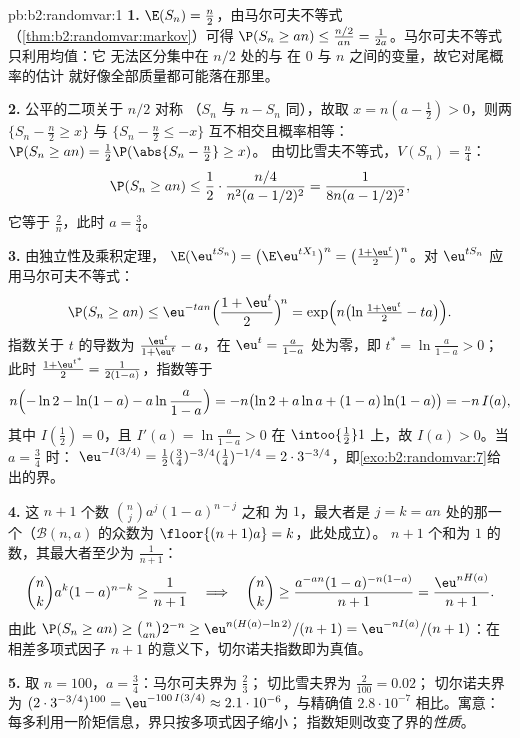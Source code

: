 \begin{solution}{pb:b2:randomvar:1}
\textbf{1.} $\E(S_n) = \frac n2$，由马尔可夫不等式
（\cref{thm:b2:randomvar:markov}）可得 $\P(S_n \geq an) \leq
\frac{n/2}{an} = \frac1{2a}$。马尔可夫不等式只利用均值：它
无法区分集中在 $n/2$ 处的与
在 $0$ 与 $n$ 之间的变量，故它对尾概率的估计
就好像全部质量都可能落在那里。

\textbf{2.} 公平的二项关于 $n/2$ 对称
（$S_n$ 与 $n - S_n$ 同），故取 $x = n(a -
\frac12) > 0$，则两 $\{S_n - \frac n2 \geq x\}$ 与
$\{S_n - \frac n2 \leq -x\}$ 互不相交且概率相等：
$\P(S_n \geq an) = \frac12\P(\abs{S_n - \frac n2} \geq x)$。
由切比雪夫不等式，$V(S_n) = \frac n4$：
\[
\P(S_n \geq an)
\leq \frac12\cdot\frac{n/4}{n^2(a - 1/2)^2}
= \frac1{8n(a - 1/2)^2},
\]
它等于 $\frac2n$，此时 $a = \frac34$。

\textbf{3.} 由独立性及乘积定理，
$\E(\eu^{tS_n}) = \bigl(\E \eu^{tX_1}\bigr)^n = \bigl(\frac{1
+ \eu^t}2\bigr)^n$。对 $\eu^{tS_n}$ 应用马尔可夫不等式：
\[
\P(S_n \geq an) \leq \eu^{-tan}\Bigl(\frac{1 +
\eu^t}2\Bigr)^{\!n} = \exp\Bigl(n\bigl(\ln\tfrac{1 +
\eu^t}2 - ta\bigr)\Bigr).
\]
指数关于 $t$ 的导数为 $\frac{\eu^t}{1 + \eu^t}
- a$，在 $\eu^t = \frac a{1-a}$ 处为零，即 $t^* =
\ln\frac a{1-a} > 0$；此时 $\frac{1 + \eu^{t^*}}2 =
\frac1{2(1-a)}$，指数等于
\[
n\Bigl(-\ln 2 - \ln(1-a) - a\ln\frac a{1-a}\Bigr)
= -n\bigl(\ln2 + a\ln a + (1-a)\ln(1-a)\bigr) = -n\,I(a),
\]
其中 $I(\frac12) = 0$，且 $I'(a) = \ln\frac a{1-a} > 0$
在 $\intoo{\frac12}1$ 上，故 $I(a) > 0$。当 $a = \frac34$ 时：
$\eu^{-I(3/4)} = \frac12(\tfrac34)^{-3/4}(\tfrac14)^{-1/4} =
2\cdot3^{-3/4}$，即\cref{exo:b2:randomvar:7}给出的界。

\textbf{4.} 这 $n + 1$ 个数 $\binom nja^j(1-a)^{n-j}$ 之和
为 $1$，最大者是 $j = k = an$ 处的那一个（$\mathcal B(n, a)$
的众数为 $\floor{(n+1)a} = k$，此处成立）。
$n + 1$ 个和为 $1$ 的数，其最大者至少为
$\frac1{n+1}$：
\[
\binom nk a^k(1-a)^{n-k} \geq \frac1{n+1}
\quad\Longrightarrow\quad
\binom nk \geq \frac{a^{-an}(1-a)^{-n(1-a)}}{n+1}
= \frac{\eu^{nH(a)}}{n+1}.
\]
由此 $\P(S_n \geq an) \geq \binom{n}{an}2^{-n} \geq
\eu^{n(H(a) - \ln2)}/(n+1) = \eu^{-nI(a)}/(n+1)$：在
相差多项式因子 $n + 1$ 的意义下，切尔诺夫指数即为真值。

\textbf{5.} 取 $n = 100$，$a = \frac34$：马尔可夫界为 $\frac23$；
切比雪夫界为 $\frac2{100} = 0.02$；
切尔诺夫界为 $(2\cdot3^{-3/4})^{100} = \eu^{-100\,I(3/4)} \approx
2.1\cdot10^{-6}$，与精确值 $2.8\cdot10^{-7}$ 相比。寓意：
每多利用一阶矩信息，界只按多项式因子缩小；
指数矩则改变了界的\emph{性质}。


\end{solution}
